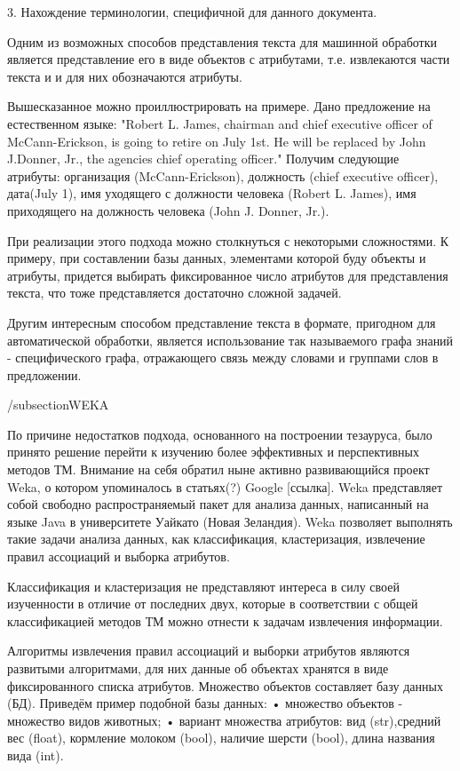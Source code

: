 3. Нахождение терминологии, специфичной для данного документа.

Одним из возможных способов представления текста для машинной обработки является
представление его в виде объектов с атрибутами, т.е. извлекаются части текста и 
и для них обозначаются атрибуты.

Вышесказанное можно проиллюстрировать на примере. Дано предложение на 
естественном языке: "Robert L. James, chairman and chief executive
officer of McCann-Erickson, is going to retire on July 1st.  He will
be replaced by John J.Donner, Jr., the agencies chief operating
officer."  Получим следующие атрибуты: организация (McCann-Erickson),
должность (chief executive officer), дата(July 1), имя уходящего с
должности человека (Robert L. James), имя приходящего на должность
человека (John J. Donner, Jr.).

При реализации этого подхода можно столкнуться с некоторыми сложностями. 
К примеру, при составлении базы данных, элементами которой буду объекты и
атрибуты, придется выбирать фиксированное число атрибутов для представления
текста, что тоже представляется достаточно сложной задачей.

Другим интересным способом представление текста в формате, пригодном для
автоматической обработки, является использование так называемого графа знаний - 
специфического графа, отражающего связь между словами и группами слов в предложении.

/subsection{WEKA}

По причине недостатков подхода, основанного на построении тезауруса, было принято решение перейти к 
изучению более эффективных и перспективных методов ТМ. Внимание на себя обратил ныне активно
развивающийся проект Weka, о котором упоминалось в статьях(?) Google [ссылка].
Weka представляет собой свободно распространяемый пакет для анализа данных, 
написанный на языке Java в университете Уайкато (Новая Зеландия). Weka позволяет 
выполнять такие задачи анализа данных, как классификация, кластеризация, извлечение 
правил ассоциаций и выборка атрибутов. 


Классификация и кластеризация не представляют интереса в силу своей изученности в отличие от
последних двух, которые в соответствии с общей классификацией методов ТМ можно отнести к задачам
извлечения информации.

Алгоритмы извлечения правил ассоциаций и выборки атрибутов являются развитыми алгоритмами,
для них данные об объектах хранятся в виде фиксированного списка атрибутов. Множество объектов
составляет базу данных (БД). Приведём пример подобной базы данных:
•	множество объектов - множество видов животных;
•	вариант множества атрибутов: вид (str),средний вес (float), кормление молоком (bool),
наличие шерсти (bool), длина названия вида (int).


